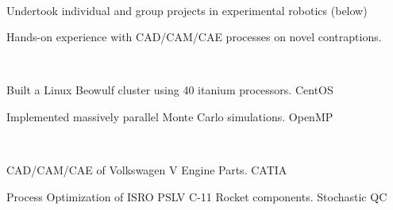 \documentclass[]{deedy-resume-openfont}
\begin{document}
\begin{minipage}[t]{0.66\textwidth}
\\
\vspace{\topsep}
\begin{tightemize}
\item Undertook individual and group projects in experimental robotics \hfill{ \selectfont (below)}
\item Hands-on experience with CAD/CAM/CAE processes on novel contraptions.
\end{tightemize}
\sectionsep

\\
\vspace{\topsep}
\begin{tightemize}
\item Built a Linux Beowulf cluster using 40 itanium processors. \hfill{ \selectfont CentOS}
\item Implemented massively parallel Monte Carlo simulations. \hfill{ \selectfont OpenMP}
\end{tightemize}
\sectionsep


\\
\vspace{\topsep}
\begin{tightemize}\item CAD/CAM/CAE of Volkswagen V Engine Parts. \hfill{ \selectfont CATIA}
\item Process Optimization of ISRO PSLV C-11 Rocket components. \hfill{ \selectfont Stochastic QC}
\end{tightemize}
\sectionsep




\end{minipage}
\end{document}
